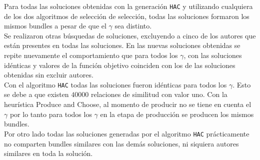 Para todas las soluciones obtenidas con la generación \texttt{HAC} y utilizando cualquiera de los 
dos algoritmos de selección de selección, todas las soluciones formaron los mismos bundles a 
pesar de que el $\gamma$ sea distinto.\\ 
Se realizaron otras búsquedas de soluciones, excluyendo a cinco de los autores que están presentes 
en todas las soluciones. En las nuevas soluciones obtenidas se repite nuevamente el comportamiento 
que para todos los $\gamma$, con las soluciones idénticas y valores de la función objetivo coinciden 
con los de las soluciones obtenidas sin excluir autores.\\
Con el algoritmo \texttt{HAC} todas las soluciones fueron idénticas para todos los $\gamma$. Esto 
se debe a que existen $40000$ relaciones de similitud con valor uno. Con la heurística Produce and 
Choose, al momento de producir no se tiene en cuenta el $\gamma$ por lo tanto para todos los 
$\gamma$ en la etapa de producción se producen los mismos bundles.\\
Por otro lado todas las soluciones generadas por el algoritmo \texttt{HAC} prácticamente no 
comparten bundles similares con las demás soluciones, ni siquiera autores similares en toda la 
solución.

